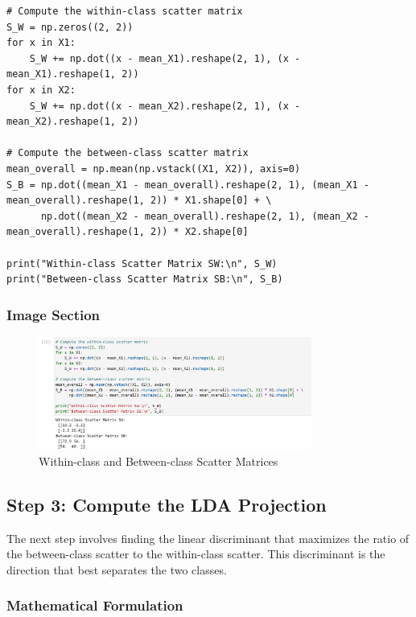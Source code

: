 \documentclass{exam}
\begin{document}
\begin{verbatim}
# Compute the within-class scatter matrix
S_W = np.zeros((2, 2))
for x in X1:
    S_W += np.dot((x - mean_X1).reshape(2, 1), (x - mean_X1).reshape(1, 2))
for x in X2:
    S_W += np.dot((x - mean_X2).reshape(2, 1), (x - mean_X2).reshape(1, 2))

# Compute the between-class scatter matrix
mean_overall = np.mean(np.vstack((X1, X2)), axis=0)
S_B = np.dot((mean_X1 - mean_overall).reshape(2, 1), (mean_X1 - mean_overall).reshape(1, 2)) * X1.shape[0] + \
      np.dot((mean_X2 - mean_overall).reshape(2, 1), (mean_X2 - mean_overall).reshape(1, 2)) * X2.shape[0]

print("Within-class Scatter Matrix SW:\n", S_W)
print("Between-class Scatter Matrix SB:\n", S_B)
\end{verbatim}

\subsubsection*{Image Section}

\begin{figure}[h!]
    \centering
    \includegraphics[width=0.8\textwidth]{images/scatter_matrices.png}
    \caption{Within-class and Between-class Scatter Matrices}
    \label{fig:scatter_matrices}
\end{figure}

\newpage

\subsection{Step 3: Compute the LDA Projection}

The next step involves finding the linear discriminant that maximizes the ratio of the between-class scatter to the within-class scatter. This discriminant is the direction that best separates the two classes.

\subsubsection*{Mathematical Formulation}
\end{document}
